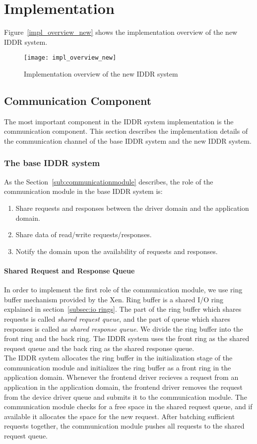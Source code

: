 \section{Implementation}

Figure~\ref{impl_overview_new} shows the implementation overview of the new IDDR system.

\begin{figure}[!ht]
\centering
\texttt{[image: impl\_overview\_new]}
\caption{Implementation overview of the new IDDR system}
\label{fig:Implementation overview}
\end{figure}

\subsection{Communication Component}
The most important component in the IDDR system implementation is the communication component. This section describes the implementation details of the communication channel of the base IDDR system and the new IDDR system. 
\subsubsection*{The base IDDR system}
As the Section~\ref{sub:communicationmodule} describes, the role of the communication module in the base IDDR system is:
\begin{enumerate} 
\item Share requests and responses between the driver domain and the application domain.
\item Share data of read/write requests/responses.
\item Notify the domain upon the availability of requests and responses. 
\end{enumerate}
\paragraph{Shared Request and Response Queue}
In order to implement the first role of the communication module, we use ring buffer mechanism provided by the Xen. Ring buffer is a shared I/O ring explained in section~\ref{subsec:io rings}. The part of the ring buffer which shares requests is called \textit{shared request queue}, and the part of queue which shares responses is called as \textit{shared response queue}. We divide the ring buffer into the front ring and the back ring. The IDDR system uses the front ring as the shared request queue and the back ring as the shared response queue. 
\\[3mm]
The IDDR system allocates the ring buffer in the initialization stage of the communication module and initializes the ring buffer as a front ring in the application domain. Whenever the frontend driver recieves a request from an application in the application domain, the frontend driver removes the request from the device driver queue and submits it to the communication module. The communication module checks for a free space in the shared request queue, and if available it allocates the space for the new request. After batching sufficient requests together, the communication module pushes all requests to the shared request queue.


